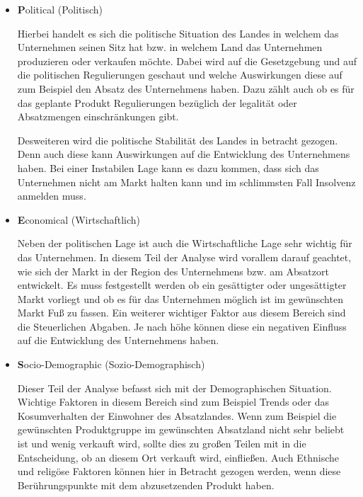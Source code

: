             \begin{itemize}
                \item \textbf Political (Politisch)
    
                    Hierbei handelt es sich die politische Situation des Landes in welchem das Unternehmen seinen Sitz hat 
                    bzw. in welchem Land das Unternehmen produzieren oder verkaufen möchte. Dabei wird auf die Gesetzgebung 
                    und auf die politischen Regulierungen geschaut und welche Auswirkungen diese auf zum Beispiel den Absatz
                    des Unternehmens haben. Dazu zählt auch ob es für das geplante Produkt Regulierungen bezüglich der 
                    legalität oder Absatzmengen einschränkungen gibt.
    
                    Desweiteren wird die politische Stabilität des Landes in betracht gezogen. Denn auch diese kann 
                    Auswirkungen auf die Entwicklung des Unternehmens haben. Bei einer Instabilen Lage kann es dazu kommen,
                    dass sich das Unternehmen nicht am Markt halten kann und im schlimmsten Fall Insolvenz anmelden muss.
    
                \item \textbf Economical (Wirtschaftlich)
                
                    Neben der politischen Lage ist auch die Wirtschaftliche Lage sehr wichtig für das Unternehmen. In diesem
                    Teil der Analyse wird vorallem darauf geachtet, wie sich der Markt in der Region des Unternehmens bzw. 
                    am Absatzort entwickelt. Es muss festgestellt werden ob ein gesättigter oder ungesättigter Markt 
                    vorliegt und ob es für das Unternehmen möglich ist im gewünschten Markt Fuß zu fassen. Ein weiterer 
                    wichtiger Faktor aus diesem Bereich sind die Steuerlichen Abgaben. Je nach höhe können diese ein 
                    negativen Einfluss auf die Entwicklung des Unternehmens haben.
    
                \item \textbf Socio-Demographic (Sozio-Demographisch)
                
                    Dieser Teil der Analyse befasst sich mit der Demographischen Situation. Wichtige Faktoren in diesem 
                    Bereich sind zum Beispiel Trends oder das Kosumverhalten der Einwohner des Absatzlandes. Wenn zum 
                    Beispiel die gewünschten Produktgruppe im gewünschten Absatzland nicht sehr beliebt ist und wenig 
                    verkauft wird, sollte dies zu großen Teilen mit in die Entscheidung, ob an diesem Ort verkauft wird, 
                    einfließen. Auch Ethnische und religöse Faktoren können hier in Betracht gezogen werden, wenn diese 
                    Berührungspunkte mit dem abzusetzenden Produkt haben.
    

\end{itemize}
